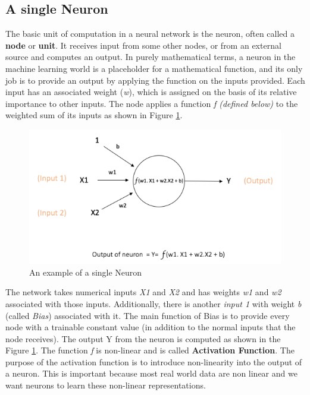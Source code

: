 \documentclass{report}
\begin{document}
\subsection{A single Neuron}
The basic unit of computation in a neural network is the neuron, often called a \textbf{node} or \textbf{unit}. It receives input from some
other nodes, or from an external source and computes an output. In purely mathematical terms, a neuron in the machine learning world is a
placeholder for a mathematical function, and its only job is to provide an output by applying the function on the inputs provided.
Each input has an associated weight (\textit{w}), which is assigned on the basis of its relative importance to other inputs. The node applies
a function \textit{f  (defined below)} to the weighted sum of its inputs as shown in Figure \ref{fig:Perceptron}.
\begin{figure}[h]
  \centering
  \includegraphics[scale=1.0]{perceptron}
  \caption{An example of a single Neuron}
  \label{fig:Perceptron}
\end{figure}
The network takes numerical inputs \textit{X1} and \textit{X2} and has weights \textit{w1} and \textit{w2} associated with those inputs.
Additionally, there is another \textit{input 1} with weight \textit{b} (called \textit{Bias}) associated with it. The main function of Bias is to provide every node with a trainable constant value (in addition to the normal inputs that the node receives). The output Y from the neuron
is computed as shown in the Figure \ref{fig:Perceptron}. The function \textit{f} is non-linear and is called \textbf{Activation Function}. The
purpose of the activation function is to introduce non-linearity into the output of a neuron. This is important because most real world data
are non linear and we want neurons to learn these non-linear representations.
\end{document}
